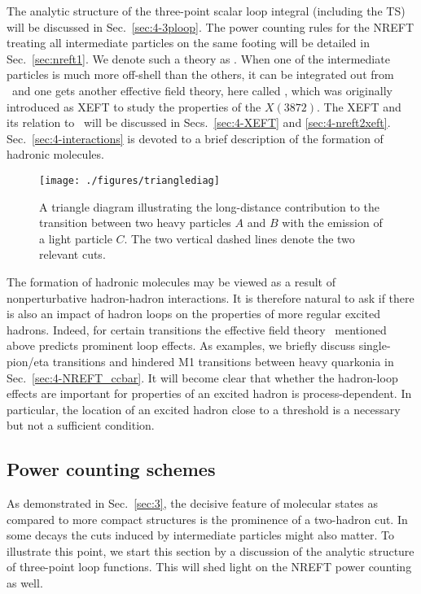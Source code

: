 The analytic structure of the three-point scalar loop integral (including the
TS) will be discussed in Sec.~\ref{sec:4-3ploop}. The power counting rules
for the NREFT treating all intermediate particles on the same footing will be
detailed in Sec.~\ref{sec:nreft1}. We denote such a theory  as \nreft. When
one of the intermediate particles is much more off-shell than the others, it can
be integrated out from \nreft~and one gets another effective field theory, here
called \nreftii, which  was originally introduced as XEFT to study the
properties of the $X(3872)$. The XEFT and its relation to \nreft~will be
discussed in Secs.~\ref{sec:4-XEFT} and \ref{sec:4-nreft2xeft}. 
Sec.~\ref{sec:4-interactions} is devoted to a brief description of the
formation of hadronic molecules.

\begin{figure}[t!]
  \begin{center}
   \texttt{[image: ./figures/trianglediag]}
   \caption{ A triangle diagram illustrating the long-distance contribution to
the transition between two heavy particles $A$ and $B$ with the emission of a
light particle $C$. The two vertical dashed lines denote the two relevant cuts.
   \label{fig:triangle}}
  \end{center}
\end{figure}

The formation of hadronic molecules may be viewed as a result of
nonperturbative hadron-hadron interactions. It is therefore natural to ask if
there is also an impact of hadron loops on the properties of more regular
excited hadrons.  Indeed, for certain transitions the effective field theory
\nreft~mentioned above  predicts prominent loop effects.
As examples, we briefly discuss single-pion/eta transitions and hindered M1
transitions between heavy quarkonia in Sec.~\ref{sec:4-NREFT_ccbar}. It will
become clear that whether the hadron-loop effects are important for
properties of an excited hadron is process-dependent. In particular, the
location of an excited hadron close to a threshold is a necessary but not
a sufficient condition.



\subsection{Power counting schemes}
\label{sec:4-pc}


As demonstrated in Sec.~\ref{sec:3}, the decisive feature of molecular states as
compared to more compact structures is the prominence of a two-hadron cut.
In some decays the cuts induced by intermediate particles might also matter.
To illustrate this point, we start this section by a discussion of the analytic
structure of three-point loop functions. This will shed light on the NREFT
power counting as well.


